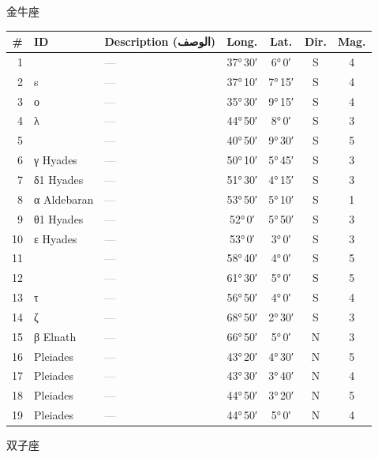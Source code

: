 \documentclass[9pt,a4paper]{extarticle}
\newcommand{\ar}[1]{{\arabicfont\textarabic{#1}}}
\begin{document}
\vspace{4pt}\quad\ar{الثور}\quad 金牛座
\begin{longtable}{r l >{\raggedright\arraybackslash}p{6.7cm} c c c c}
\toprule \# & ID & Description (\ar{الوصف}) & Long. & Lat. & Dir. & Mag.\\ \midrule\endhead
1 &  & \textcolor{gray}{—} & 37°\,30′ & 6°\,0′ & S & 4\\
2 & s & \textcolor{gray}{—} & 37°\,10′ & 7°\,15′ & S & 4\\
3 & ο & \textcolor{gray}{—} & 35°\,30′ & 9°\,15′ & S & 4\\
4 & λ & \textcolor{gray}{—} & 44°\,50′ & 8°\,0′ & S & 3\\
5 &  & \textcolor{gray}{—} & 40°\,50′ & 9°\,30′ & S & 5\\
6 & γ Hyades & \textcolor{gray}{—} & 50°\,10′ & 5°\,45′ & S & 3\\
7 & δ1 Hyades & \textcolor{gray}{—} & 51°\,30′ & 4°\,15′ & S & 3\\
8 & α Aldebaran & \textcolor{gray}{—} & 53°\,50′ & 5°\,10′ & S & 1\\
9 & θ1 Hyades & \textcolor{gray}{—} & 52°\,0′ & 5°\,50′ & S & 3\\
10 & ε Hyades & \textcolor{gray}{—} & 53°\,0′ & 3°\,0′ & S & 3\\
11 &  & \textcolor{gray}{—} & 58°\,40′ & 4°\,0′ & S & 5\\
12 &  & \textcolor{gray}{—} & 61°\,30′ & 5°\,0′ & S & 5\\
13 & τ & \textcolor{gray}{—} & 56°\,50′ & 4°\,0′ & S & 4\\
14 & ζ & \textcolor{gray}{—} & 68°\,50′ & 2°\,30′ & S & 3\\
15 & β Elnath & \textcolor{gray}{—} & 66°\,50′ & 5°\,0′ & N & 3\\
16 & Pleiades & \textcolor{gray}{—} & 43°\,20′ & 4°\,30′ & N & 5\\
17 & Pleiades & \textcolor{gray}{—} & 43°\,30′ & 3°\,40′ & N & 4\\
18 & Pleiades & \textcolor{gray}{—} & 44°\,50′ & 3°\,20′ & N & 5\\
19 & Pleiades & \textcolor{gray}{—} & 44°\,50′ & 5°\,0′ & N & 4\\
\bottomrule\end{longtable}
\vspace{4pt}\quad\ar{الجوزاء}\quad 双子座
\end{document}
